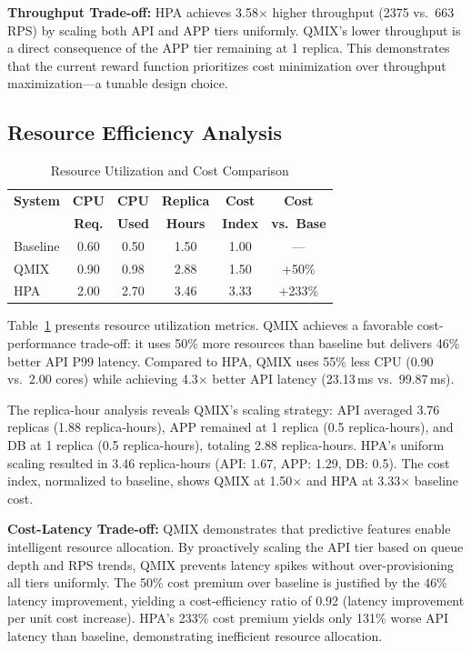 \documentclass[conference]{IEEEtran}
\begin{document}
\textbf{Throughput Trade-off:} HPA achieves 3.58$\times$ higher throughput
(2375 vs.\ 663 RPS) by scaling both API and APP tiers uniformly. QMIX's
lower throughput is a direct consequence of the APP tier remaining at 1
replica. This demonstrates that the current reward function prioritizes
cost minimization over throughput maximization---a tunable design choice.

\subsection{Resource Efficiency Analysis}

\begin{table}[t]
\centering
\caption{Resource Utilization and Cost Comparison}
\label{tab:resources}
\setlength{\tabcolsep}{4pt}
\begin{tabular}{lccccc}
\toprule
\textbf{System} & \textbf{CPU} & \textbf{CPU} & \textbf{Replica} & \textbf{Cost} & \textbf{Cost} \\
 & \textbf{Req.} & \textbf{Used} & \textbf{Hours} & \textbf{Index} & \textbf{vs.\ Base} \\
\midrule
Baseline & 0.60 & 0.50 & 1.50 & 1.00 & --- \\
QMIX & 0.90 & 0.98 & 2.88 & 1.50 & +50\% \\
HPA & 2.00 & 2.70 & 3.46 & 3.33 & +233\% \\
\bottomrule
\end{tabular}
\end{table}

Table~\ref{tab:resources} presents resource utilization metrics. QMIX
achieves a favorable cost-performance trade-off: it uses 50\% more
resources than baseline but delivers 46\% better API P99 latency.
Compared to HPA, QMIX uses 55\% less CPU (0.90 vs.\ 2.00 cores) while
achieving 4.3$\times$ better API latency (23.13\,ms vs.\ 99.87\,ms).

The replica-hour analysis reveals QMIX's scaling strategy: API averaged
3.76 replicas (1.88 replica-hours), APP remained at 1 replica (0.5
replica-hours), and DB at 1 replica (0.5 replica-hours), totaling 2.88
replica-hours. HPA's uniform scaling resulted in 3.46 replica-hours
(API: 1.67, APP: 1.29, DB: 0.5). The cost index, normalized to baseline,
shows QMIX at 1.50$\times$ and HPA at 3.33$\times$ baseline cost.

\textbf{Cost-Latency Trade-off:} QMIX demonstrates that predictive
features enable intelligent resource allocation. By proactively scaling
the API tier based on queue depth and RPS trends, QMIX prevents latency
spikes without over-provisioning all tiers uniformly. The 50\% cost
premium over baseline is justified by the 46\% latency improvement,
yielding a cost-efficiency ratio of 0.92 (latency improvement per unit
cost increase). HPA's 233\% cost premium yields only 131\% worse API
latency than baseline, demonstrating inefficient resource allocation.
\end{document}
